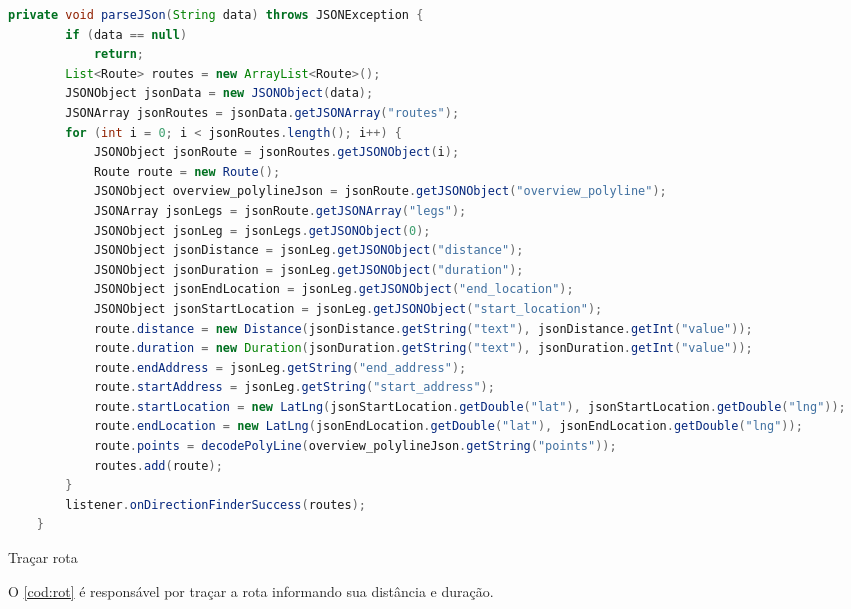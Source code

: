 \begin{codigo}[H]
	\begin{lstlisting}[language=Java]
	private void parseJSon(String data) throws JSONException {
        if (data == null)
            return;
        List<Route> routes = new ArrayList<Route>();
        JSONObject jsonData = new JSONObject(data);
        JSONArray jsonRoutes = jsonData.getJSONArray("routes");
        for (int i = 0; i < jsonRoutes.length(); i++) {
            JSONObject jsonRoute = jsonRoutes.getJSONObject(i);
            Route route = new Route();
            JSONObject overview_polylineJson = jsonRoute.getJSONObject("overview_polyline");
            JSONArray jsonLegs = jsonRoute.getJSONArray("legs");
            JSONObject jsonLeg = jsonLegs.getJSONObject(0);
            JSONObject jsonDistance = jsonLeg.getJSONObject("distance");
            JSONObject jsonDuration = jsonLeg.getJSONObject("duration");
            JSONObject jsonEndLocation = jsonLeg.getJSONObject("end_location");
            JSONObject jsonStartLocation = jsonLeg.getJSONObject("start_location");
            route.distance = new Distance(jsonDistance.getString("text"), jsonDistance.getInt("value"));
            route.duration = new Duration(jsonDuration.getString("text"), jsonDuration.getInt("value"));
            route.endAddress = jsonLeg.getString("end_address");
            route.startAddress = jsonLeg.getString("start_address");
            route.startLocation = new LatLng(jsonStartLocation.getDouble("lat"), jsonStartLocation.getDouble("lng"));
            route.endLocation = new LatLng(jsonEndLocation.getDouble("lat"), jsonEndLocation.getDouble("lng"));
            route.points = decodePolyLine(overview_polylineJson.getString("points"));
            routes.add(route);
        }
        listener.onDirectionFinderSuccess(routes);
    }
 	\end{lstlisting}
 	\caption{Traçar rota}
 	\label{cod:rot}
\end{codigo}

O \autoref{cod:rot} é responsável por traçar a rota informando sua distância e duração. 






